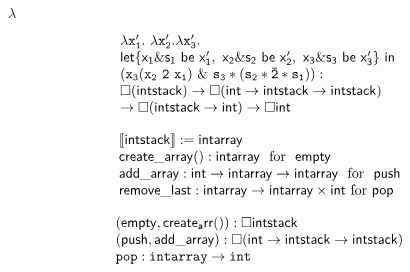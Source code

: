 \documentclass[10pt]{book}
\begin{document}
\begin{mdSnippets}
\begin{mdDisplaySnippet}[ad876f09899194c52ba4252a80fbe94e]
\[\]%
\end{mdDisplaySnippet}%
\begin{mdInlineSnippet}[c6a6eb61fd9c6c913da73b3642ca147d]%
$\lambda$\end{mdInlineSnippet}%
\begin{mdDisplaySnippet}[7a9876cc038542e0a4c2b6670b27bd40]%
\[%
\begin{array}{l l}
\mathtt{\lambda x_1^{\prime}.\  \lambda x_2^{\prime}. \lambda x_3^{\prime}}. \\
                 {\sf  let\{ x_1\& s_1 {\ \sf be \ } x_1^{\prime},
       \ x_2\& s_2 {\ \sf be \ } x_2^{\prime}, \  x_3\& s_3 
       {\ \sf be \ } x_3^{\prime} \}\  in}\ \\   
       \mathtt{(x_3 (x_2\ 2 \ x_1)\ \& \ s_3*(s_2* \bar{2}*s_1)):}\\
           {\sf \Box(intstack)\rightarrow 
            \Box(int\rightarrow intstack\rightarrow intstack)} \\
           {\sf \rightarrow \Box (intstack\rightarrow int) \rightarrow \Box int}
\end{array}
\]%
\end{mdDisplaySnippet}%
\begin{mdDisplaySnippet}[5696476788373d8ac253a9652925063a]%
\[%
\begin{array}{l}
\llbracket {\sf intstack} \rrbracket:= {\sf intarray} \\
 {\sf create\_array(): intarray} \ \  \text{for}\ \ {\sf empty}\\
  {\sf add\_array: int \rightarrow intarray\rightarrow intarray}\ \  \text{for} \ \ {\sf push}\\
 {\sf remove\_last: intarray\rightarrow intarray\times int }\  \text{for}\  {\sf pop}
\end{array}
\]%
\end{mdDisplaySnippet}%
\begin{mdDisplaySnippet}[4293af8dc4b81d34f889bdc0202e1261]%
\[%
 \begin{array}{l}
 {\sf (empty, create_arr()):\Box intstack} \\
 {\sf (push, add\_array): \Box (int \rightarrow  intstack\rightarrow intstack)  } \\
\mathtt{pop: intarray \rightarrow int } 
\end{array}
\]%
\end{mdDisplaySnippet}%

\end{mdSnippets}
\end{document}
